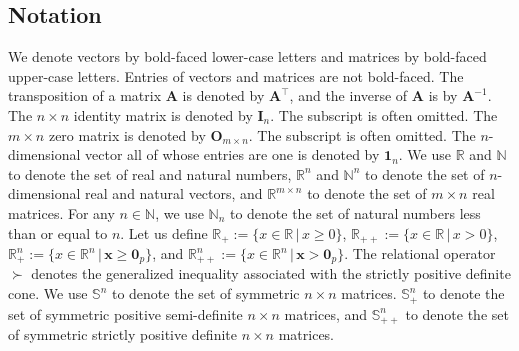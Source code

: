 \documentclass[10pt,onecolumn]{article}
\theoremstyle{definition}
\theoremstyle{definition}
\theoremstyle{definition}
\theoremstyle{definition}
\theoremstyle{definition}
\theoremstyle{theorem}
\newcommand{\0}{{\bm{0}}}
\newcommand{\1}{{\bm{1}}}
\newcommand{\x}{{\bm{x}}}
\newcommand{\vA}{{\bm{A}}}
\newcommand{\vE}{{\bm{E}}}
\newcommand{\vI}{{\bm{I}}}
\newcommand{\bN}{{\mathbb{N}}}
\newcommand{\vO}{{\bm{O}}}
\newcommand{\bR}{{\mathbb{R}}}
\newcommand{\bS}{{\mathbb{S}}}
\newcommand{\X}{{\bm{X}}}
\begin{document}
\subsection{Notation}
%
%
We denote vectors by bold-faced lower-case letters and
matrices by bold-faced upper-case letters.
%
Entries of vectors and matrices are not bold-faced.
%
The transposition of a matrix $\vA$ is denoted by $\vA^{\top}$,
and the inverse of $\vA$ is by $\vA^{-1}$.
%
The $n\times n$ identity matrix is denoted by $\vI_{n}$. 
The subscript is often omitted. 
%
The $m\times n$ zero matrix is denoted by $\vO_{m\times n}$. 
The subscript is often omitted. 
%
The $n$-dimensional vector all of whose entries are one is denoted by $\1_{n}$.
We use $\bR$ and $\bN$ to denote the set of real and natural numbers,
$\bR^{n}$ and $\bN^{n}$ to denote the set of $n$-dimensional real and natural vectors,
and $\bR^{m\times n}$ to denote the set of $m\times n$ real matrices.
%
For any $n\in\bN$, we use $\bN_{n}$ to denote the set of natural numbers less than or equal to $n$.
%
% 
%
%
Let us define 
$\bR_{+}:=\{ x\in\bR \,|\, x\ge 0 \}$,
$\bR_{++}:=\{ x\in\bR \,|\, x> 0 \}$,  
$\bR_{+}^{n}:=\{ x\in\bR^{n} \,|\, \x\ge \0_{p} \}$, and 
$\bR_{++}^{n}:=\{ x\in\bR^{n} \,|\, \x> \0_{p} \}$. 
%
The relational operator $\succ$ denotes the generalized inequality
associated with the strictly positive definite cone.
%
We use
$\bS^{n}$ to denote the set of symmetric $n\times n$ matrices.
$\bS_{+}^{n}$ to denote the set of symmetric positive semi-definite $n\times n$ matrices,
and
$\bS_{++}^{n}$ to denote the set of symmetric strictly positive definite $n\times n$ matrices.
%
\end{document}
